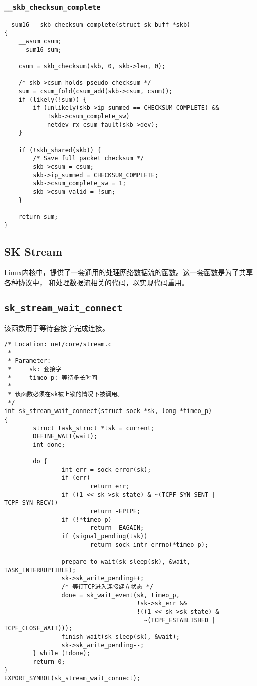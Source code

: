             \subsubsection{\texttt{__skb_checksum_complete}}
\begin{verbatim}
__sum16 __skb_checksum_complete(struct sk_buff *skb)
{
    __wsum csum;
    __sum16 sum;

    csum = skb_checksum(skb, 0, skb->len, 0);

    /* skb->csum holds pseudo checksum */
    sum = csum_fold(csum_add(skb->csum, csum));
    if (likely(!sum)) {
        if (unlikely(skb->ip_summed == CHECKSUM_COMPLETE) &&
            !skb->csum_complete_sw)
            netdev_rx_csum_fault(skb->dev);
    }

    if (!skb_shared(skb)) {
        /* Save full packet checksum */
        skb->csum = csum;
        skb->ip_summed = CHECKSUM_COMPLETE;
        skb->csum_complete_sw = 1;
        skb->csum_valid = !sum;
    }

    return sum;
}
\end{verbatim}    
        \subsection{SK Stream}
Linux内核中，提供了一套通用的处理网络数据流的函数。这一套函数是为了共享各种协议中，
和处理数据流相关的代码，以实现代码重用。
\subsection{\texttt{sk_stream_wait_connect}}
该函数用于等待套接字完成连接。
\begin{verbatim}
/* Location: net/core/stream.c
 *
 * Parameter:
 *     sk: 套接字
 *     timeo_p: 等待多长时间
 *
 * 该函数必须在sk被上锁的情况下被调用。
 */
int sk_stream_wait_connect(struct sock *sk, long *timeo_p)
{
        struct task_struct *tsk = current;
        DEFINE_WAIT(wait);
        int done;

        do {
                int err = sock_error(sk);
                if (err)
                        return err;
                if ((1 << sk->sk_state) & ~(TCPF_SYN_SENT | TCPF_SYN_RECV))
                        return -EPIPE;
                if (!*timeo_p)
                        return -EAGAIN;
                if (signal_pending(tsk))
                        return sock_intr_errno(*timeo_p);

                prepare_to_wait(sk_sleep(sk), &wait, TASK_INTERRUPTIBLE);
                sk->sk_write_pending++;
                /* 等待TCP进入连接建立状态 */
                done = sk_wait_event(sk, timeo_p,
                                     !sk->sk_err &&
                                     !((1 << sk->sk_state) &
                                       ~(TCPF_ESTABLISHED | TCPF_CLOSE_WAIT)));
                finish_wait(sk_sleep(sk), &wait);
                sk->sk_write_pending--;
        } while (!done);
        return 0;
}
EXPORT_SYMBOL(sk_stream_wait_connect);
\end{verbatim}

